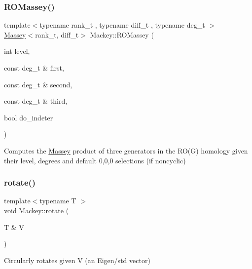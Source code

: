 \subsubsection{\texorpdfstring{R\+O\+Massey()}{ROMassey()}\hspace{0.1cm}{\footnotesize\ttfamily [2/2]}}
{\footnotesize\ttfamily template$<$typename rank\+\_\+t , typename diff\+\_\+t , typename deg\+\_\+t $>$ \\
\hyperlink{classMackey_1_1Massey}{Massey}$<$rank\+\_\+t, diff\+\_\+t$>$ Mackey\+::\+R\+O\+Massey (\begin{DoxyParamCaption}\item[{int}]{level,  }\item[{const deg\+\_\+t \&}]{first,  }\item[{const deg\+\_\+t \&}]{second,  }\item[{const deg\+\_\+t \&}]{third,  }\item[{bool}]{do\+\_\+indeter }\end{DoxyParamCaption})\hspace{0.3cm}{\ttfamily [inline]}}



Computes the \hyperlink{classMackey_1_1Massey}{Massey} product of three generators in the R\+O(\+G) homology given their level, degrees and default 0,0,0 selections (if noncyclic) 

\mbox{\label{namespaceMackey_a38a833de54971845cbdb8c96f830725b}} 
\subsubsection{\texorpdfstring{rotate()}{rotate()}}
{\footnotesize\ttfamily template$<$typename T $>$ \\
void Mackey\+::rotate (\begin{DoxyParamCaption}\item[{T \&}]{V }\end{DoxyParamCaption})}



Circularly rotates given V (an Eigen/std vector) 

